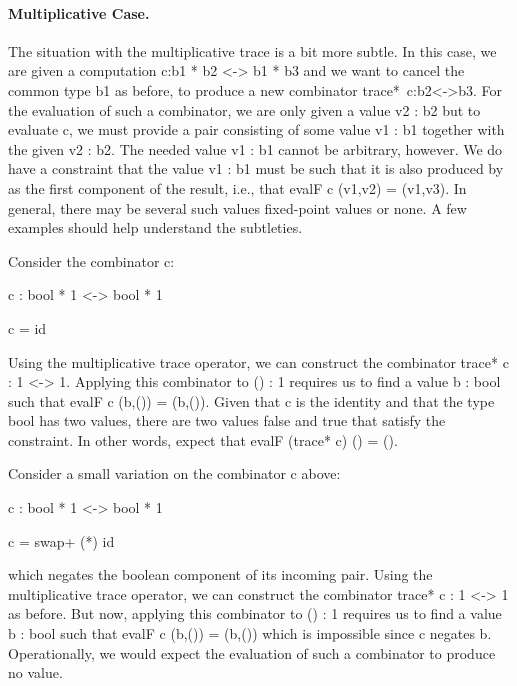 \documentclass{llncs}
\begin{document}
\paragraph*{Multiplicative Case.} 
The situation with the multiplicative trace is a bit more subtle. In
this case, we are given a computation {{c:b1 * b2 <-> b1 * b3}} and we
want to cancel the common type {{b1}} as before, to produce a new
combinator {{trace*~c:b2<->b3}}. For the evaluation of such a
combinator, we are only given a value {{v2 : b2}} but to evaluate
{{c}}, we must provide a pair consisting of some value {{v1 : b1}}
together with the given {{v2 : b2}}. The needed value {{v1 : b1}}
cannot be arbitrary, however. We do have a constraint that the value
{{v1 : b1}} must be such that it is also produced by as the first
component of the result, i.e., that {{evalF c (v1,v2) = (v1,v3)}}. In
general, there may be several such values fixed-point values or
none. A few examples should help understand the subtleties.

\begin{example}
Consider the combinator {{c}}:

{{c : bool * 1 <-> bool * 1}} 

{{c = id}}

\noindent Using the multiplicative trace operator, we can construct the
combinator {{trace* c : 1 <-> 1}}. Applying this combinator to 
{{() : 1}} requires us to find a value {{b : bool}} such that 
{{evalF c (b,()) = (b,())}}. Given that {{c}} is the identity and that the type {{bool}} 
has two values, there are two values {{false}} and {{true}} that satisfy the 
constraint. In other words, expect that {{evalF (trace* c) () = ()}}. 
\end{example}

\begin{example}
\label{ch3:ex:annihilate}
Consider a small variation on the combinator {{c}} above:

{{c : bool * 1 <-> bool * 1}} 

{{c = swap+ (*) id }}

\noindent which negates the boolean component of its incoming
pair. Using the multiplicative trace operator, we can construct the
combinator {{trace* c : 1 <-> 1}} as before. But now, applying this
combinator to {{() : 1}} requires us to find a value {{b : bool}} such
that {{evalF c (b,()) = (b,())}} which is impossible since {{c}} negates
{{b}}. Operationally, we would expect the evaluation of such a
combinator to produce no value. 
\end{example}
\end{document}
